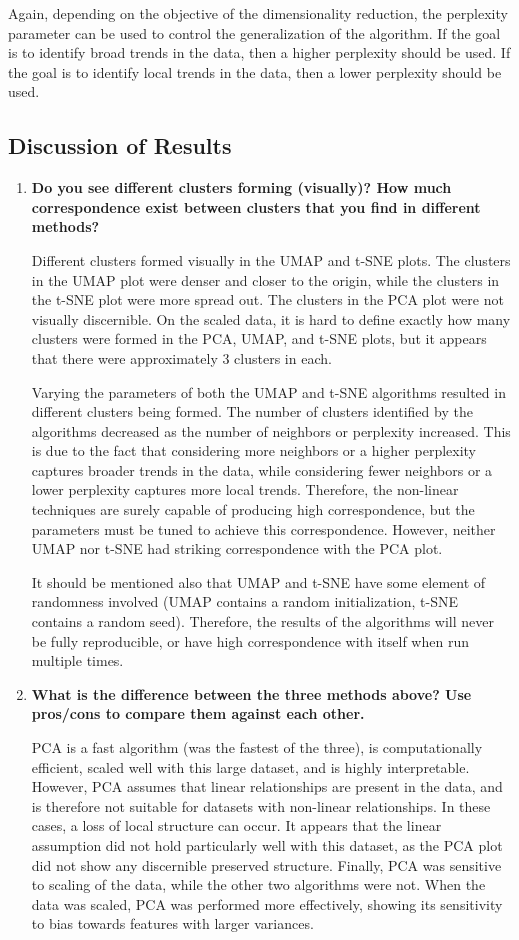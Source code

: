 \documentclass[11pt]{article}
\begin{document}
Again, depending on the objective of the dimensionality reduction, the perplexity parameter can be used to control the generalization of the algorithm. If the goal is to identify broad trends in the data, then a higher perplexity should be used. If the goal is to identify local trends in the data, then a lower perplexity should be used.

\subsection{Discussion of Results}
\begin{enumerate}
    \item \textbf{Do you see different clusters forming (visually)? How much correspondence exist between clusters that you find in different methods?}

    Different clusters formed visually in the UMAP and t-SNE plots. The clusters in the UMAP plot were denser and closer to the origin, while the clusters in the t-SNE plot were more spread out. The clusters in the PCA plot were not visually discernible. On the scaled data, it is hard to define exactly how many clusters were formed in the PCA, UMAP, and t-SNE plots, but it appears that there were approximately 3 clusters in each.

    Varying the parameters of both the UMAP and t-SNE algorithms resulted in different clusters being formed. The number of clusters identified by the algorithms decreased as the number of neighbors or perplexity increased. This is due to the fact that considering more neighbors or a higher perplexity captures broader trends in the data, while considering fewer neighbors or a lower perplexity captures more local trends. Therefore, the non-linear techniques are surely capable of producing high correspondence, but the parameters must be tuned to achieve this correspondence. However, neither UMAP nor t-SNE had striking correspondence with the PCA plot.

    It should be mentioned also that UMAP and t-SNE have some element of randomness involved (UMAP contains a random initialization, t-SNE contains a random seed). Therefore, the results of the algorithms will never be fully reproducible, or have high correspondence with itself when run multiple times. 

    \item \textbf{What is the difference between the three methods above? Use pros/cons to compare them against each other.}
    
    PCA is a fast algorithm (was the fastest of the three), is computationally efficient, scaled well with this large dataset, and is highly interpretable. However, PCA assumes that linear relationships are present in the data, and is therefore not suitable for datasets with non-linear relationships. In these cases, a loss of local structure can occur. It appears that the linear assumption did not hold particularly well with this dataset, as the PCA plot did not show any discernible preserved structure. Finally, PCA was sensitive to scaling of the data, while the other two algorithms were not. When the data was scaled, PCA was performed more effectively, showing its sensitivity to bias towards features with larger variances.


\end{enumerate}
\end{document}

